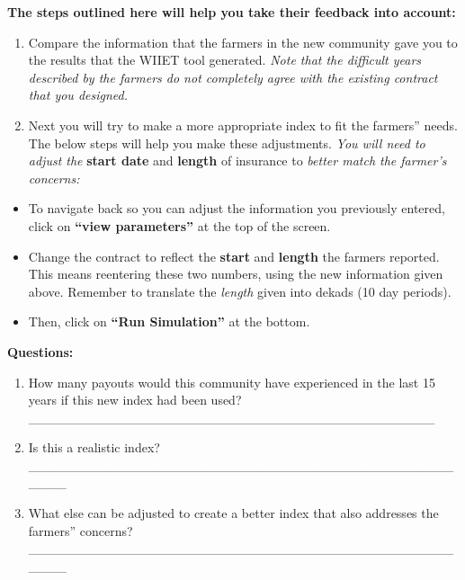 \documentclass[letterpaper,10pt,english]{sphinxmanual}
\begin{document}
\textbf{The steps outlined here will help you take their feedback into account:}
\begin{enumerate}
\item {} 
Compare the information that the farmers in the new community gave you to the results that the WIIET tool generated. \emph{Note that the difficult years described by the farmers do not completely agree with the existing contract that you designed.}

\item {} 
Next you will try to make a more appropriate index to fit the farmers'' needs. The below steps will help you make these adjustments. \emph{You will need to adjust the} \textbf{start date} and \textbf{length} of insurance to \emph{better match the farmer's concerns:}

\end{enumerate}
\begin{itemize}
\item {} 
To navigate back so you can adjust the information you previously entered, click on \textbf{``view parameters''} at the top of the screen.

\item {} 
Change the contract to reflect the \textbf{start} and \textbf{length} the farmers reported. This means reentering these two numbers, using the new information given above. Remember to translate the \emph{length} given into dekads (10 day periods).

\item {} 
Then, click on \textbf{``Run Simulation''} at the bottom.

\end{itemize}

\textbf{Questions:}
\begin{enumerate}
\item {} 
How many payouts would this community have experienced in the last 15 years if this new index had been used? \_\_\_\_\_\_\_\_\_\_\_\_\_\_\_\_\_\_\_\_\_\_\_\_\_\_\_\_\_\_\_\_\_\_\_\_\_\_\_\_\_\_\_

\item {} 
Is this a realistic index?  \_\_\_\_\_\_\_\_\_\_\_\_\_\_\_\_\_\_\_\_\_\_\_\_\_\_\_\_\_\_\_\_\_\_\_\_\_\_\_\_\_\_\_\_\_\_\_\_\_

\item {} 
What else can be adjusted to create a better index that also addresses the farmers'' concerns? \_\_\_\_\_\_\_\_\_\_\_\_\_\_\_\_\_\_\_\_\_\_\_\_\_\_\_\_\_\_\_\_\_\_\_\_\_\_\_\_\_\_\_\_\_\_\_\_\_

\end{enumerate}
\end{document}
